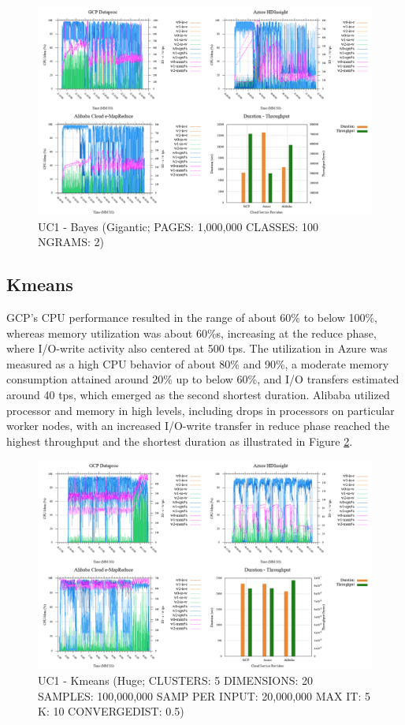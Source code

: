 \documentclass[review]{elsarticle}
\begin{document}
\begin{figure}[p]
	\caption{UC1 - Bayes (Gigantic; PAGES: 1,000,000 CLASSES: 100 NGRAMS: 2)}
	\label{fig:uc1-bayes-g-cmidt}
	\includegraphics[width=\textwidth]{uc1-bayes-g-cmidt}
	\centering
\end{figure}


\subsection{Kmeans}
GCP's CPU performance resulted in the range of about 60\% to below 100\%, whereas memory utilization was about 60\%s, increasing at the reduce phase, where I/O-write activity also centered at 500 tps. The utilization in Azure was measured as a high CPU behavior of about 80\% and 90\%, a moderate memory consumption attained around 20\% up to below 60\%, and I/O transfers estimated around 40 tps, which emerged as the second shortest duration. Alibaba utilized processor and memory in high levels, including drops in processors on particular worker nodes, with an increased I/O-write transfer in reduce phase reached the highest throughput and the shortest duration as illustrated in Figure \ref{fig:uc1-kmeans-h-cmidt}.

\begin{figure}[p]
	\caption{UC1 - Kmeans (Huge; CLUSTERS: 5 DIMENSIONS: 20 SAMPLES: 100,000,000 SAMP PER INPUT: 20,000,000 MAX IT: 5 K: 10 CONVERGEDIST: 0.5)}
	\label{fig:uc1-kmeans-h-cmidt}
	\includegraphics[width=\textwidth]{uc1-kmeans-h-cmidt}
	\centering
\end{figure}
\end{document}
